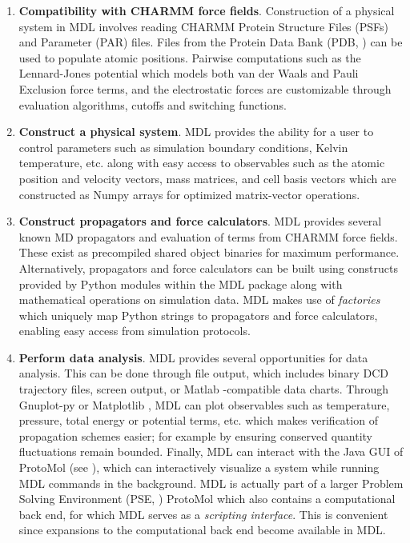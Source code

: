 \documentclass[11pt]{report}
\begin{document}
\begin{enumerate}
\item {\bf Compatibility with CHARMM force fields}.  Construction
of a physical system in MDL involves reading CHARMM \cite{Broo83} Protein
Structure Files (PSFs) and Parameter (PAR) files.  Files from the 
Protein Data Bank (PDB, \cite{BERN77}) can be used to populate atomic positions.
Pairwise computations such as the Lennard-Jones potential \cite{} which
models both van der Waals and Pauli Exclusion force terms, and the
electrostatic forces are customizable through evaluation algorithms, cutoffs
and switching functions.
\item {\bf Construct a physical system}. MDL provides the ability
for a user to control parameters such as simulation boundary conditions, 
Kelvin temperature, etc. along with easy access to observables such
as the atomic position and velocity vectors, mass matrices, and cell
basis vectors which are constructed as Numpy \cite{NUMP05} arrays for
optimized matrix-vector operations.
\item {\bf Construct propagators and force calculators}. MDL provides
several known MD propagators and evaluation of terms from CHARMM
force fields.  These exist as precompiled shared object binaries
for maximum performance.  Alternatively, propagators and force calculators
can be built using constructs provided by Python modules within the MDL
package along with mathematical operations on simulation data.  
MDL makes use of {\it factories} \cite{Alex01} which uniquely
map Python strings to propagators and force calculators, enabling easy
access from simulation protocols.
\item {\bf Perform data analysis}. MDL provides several opportunities
for data analysis.  This can be done through file output, which includes
binary DCD trajectory files, screen output, or Matlab \cite{MATH05}-compatible
data charts.  Through Gnuplot-py \cite{GNUP05} or Matplotlib \cite{MATP05}, MDL can
plot observables such as temperature, pressure, total energy or potential
terms, etc. which makes verification of propagation schemes easier; for
example by ensuring conserved quantity fluctuations remain bounded.
Finally, MDL can interact with the Java GUI of ProtoMol (see \cite{Matt04}),
which can interactively visualize a system while running MDL commands
in the background.  MDL is actually part of a larger Problem Solving
Environment (PSE, \cite{GaHR94, MHK+06}) ProtoMol which also contains a computational back
end, for which MDL serves as a {\it scripting interface}.  This is convenient
since expansions to the computational back end become available in MDL.
\end{enumerate}
\end{document}
